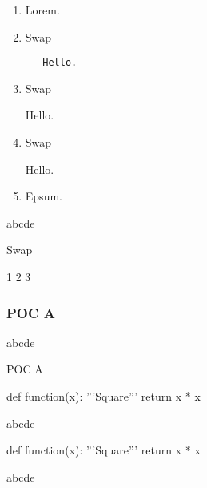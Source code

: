 \begin{enumerate}
  \item Lorem.
  \item \mbox{}
  \begin{codebox}{Swap}
    \begin{Verbatim}
   Hello.
   \end{Verbatim}
  \end{codebox}
  \item \mbox{}
  \begin{codebox}{Swap}
    \begin{CDRBlock}
   Hello.
   \end{CDRBlock}
  \end{codebox}
  \item \mbox{}
  \begin{codebox}{Swap}
    \begin{CDRBlock}[pygments=false]
   Hello.
   \end{CDRBlock}
  \end{codebox}
  \item Epsum.
\end{enumerate}
abcde
\begin{codebox}{Swap}
\begin{CDRBlock}[numbersep=1cm]
1
2
3
\end{CDRBlock}
\end{codebox}
\subsubsection{POC A}
\bgroup
abcde
\makeatletter
\def\FVB@POCCodeBoxA {
  \@bsphack
  \FV@VerbatimBegin
  \FV@Scan
}
\def\FVE@POCCodeBoxA {
  \FV@VerbatimEnd
  \@esphack
}
\makeatother
\begin{codebox}{POC A}
\begin{POCCodeBoxA}
def function(x):
  '''Square'''
  return x * x
\end{POCCodeBoxA}
\end{codebox}
abcde
\begin{POCCodeBoxA}
def function(x):
  '''Square'''
  return x * x
\end{POCCodeBoxA}
abcde
\egroup
